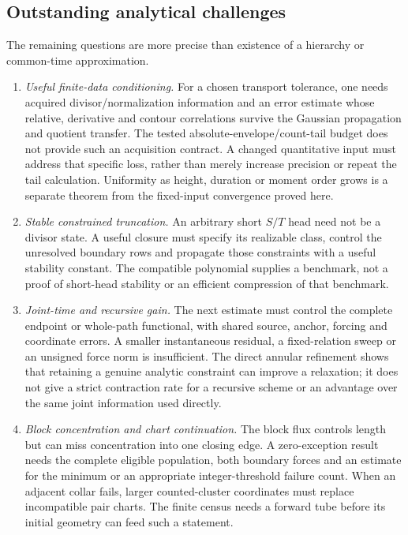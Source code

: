 \subsection{Outstanding analytical challenges}

The remaining questions are more precise than existence of a hierarchy
or common-time approximation.

\begin{enumerate}
\item \emph{Useful finite-data conditioning.}
For a chosen transport tolerance, one needs acquired divisor/normalization
information and an error estimate whose relative, derivative and contour
correlations survive the Gaussian propagation and quotient transfer.
The tested absolute-envelope/count-tail budget does not provide such an
acquisition contract. A changed quantitative input must address that
specific loss, rather than merely increase precision or repeat the tail
calculation. Uniformity as height, duration or moment order grows is a
separate theorem from the fixed-input convergence proved here.

\item \emph{Stable constrained truncation.}
An arbitrary short $S/T$ head need not be a divisor state. A useful
closure must specify its realizable class, control the unresolved boundary
rows and propagate those constraints with a useful stability constant.
The compatible polynomial supplies a benchmark, not a proof of
short-head stability or an efficient compression of that benchmark.

\item \emph{Joint-time and recursive gain.}
The next estimate must control the complete endpoint or whole-path
functional, with shared source, anchor, forcing and coordinate errors.
A smaller instantaneous residual, a fixed-relation sweep or an unsigned
force norm is insufficient. The direct annular refinement shows that
retaining a genuine analytic constraint can improve a relaxation; it does
not give a strict contraction rate for a recursive scheme or an advantage
over the same joint information used directly.

\item \emph{Block concentration and chart continuation.}
The block flux controls length but can miss concentration into one closing
edge. A zero-exception result needs the complete eligible population,
both boundary forces and an estimate for the minimum or an appropriate
integer-threshold failure count. When an adjacent collar fails, larger
counted-cluster coordinates must replace incompatible pair charts.
The finite census needs a forward tube before its initial geometry can
feed such a statement.


\end{enumerate}
